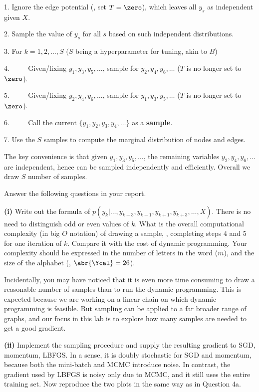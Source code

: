 \documentclass[11pt]{report}
\begin{document}
\begin{itemize}
	1. Ignore the edge potential (\ie, set $T=\zero$), which leaves all $y_s$ as independent given $X$.
	
	2. Sample the value of $y_s$ for all $s$ based on such independent distributions.
	
	3. For $k = 1, 2, \ldots, S$ ($S$ being a hyperparameter for tuning, akin to $B$)
	
	4. $\qquad$ Given/fixing $y_1, y_3, y_5, \ldots$, sample for $y_2, y_4, y_6, \ldots$ ($T$ is no longer set to $\zero$).
	
	5. $\qquad$ Given/fixing $y_2, y_4, y_6, \ldots$, sample for $y_1, y_3, y_5, \ldots$ ($T$ is no longer set to $\zero$).
	
	6. $\qquad$ Call the current $\{y_1, y_2, y_3, y_4, \ldots\}$ as a \textbf{sample}.
	
	7. Use the $S$ samples to compute the marginal distribution of nodes and edges.
	
	The key convenience is that given $y_1, y_3, y_5, \ldots$, 
	the remaining variables $y_2, y_4, y_6, \ldots$ are independent, hence can be sampled independently and efficiently.
	Overall we draw $S$ number of samples.
	
	
	
	
	Answer the following questions in your report.
	
	\textbf{(i)} 
	Write out the formula of $p(y_k|\ldots, y_{k-3}, y_{k-1}, y_{k+1}, y_{k+3}, \ldots, X)$.
	There is no need to distinguish odd or even values of $k$. 
	What is the overall computational complexity (in big $O$ notation) of drawing a sample, \ie, completing steps 4 and 5 for one iteration of $k$.
	Compare it with the cost of dynamic programming.
	Your complexity should be expressed in the number of letters in the word ($m$),
	and the size of the alphabet (\ie, $\abr{\Ycal}=26$).
	
	Incidentally, you may have noticed that it is even more time consuming to draw a reasonable number of samples than to run the dynamic programming.
	This is expected because we are working on a linear chain on which dynamic programming is feasible.
	But sampling can be applied to a far broader range of graphs,
	and our focus in this lab is to explore how many samples are needed to get a good gradient.
	
	\textbf{(ii)} 
	Implement the sampling procedure and supply the resulting gradient to SGD, momentum, LBFGS.
	In a sense, it is doubly stochastic for SGD and momentum, because both the mini-batch and MCMC introduce noise. 
	In contrast, the gradient used by LBFGS is noisy only due to MCMC,
	and it still uses the entire training set.
	Now reproduce the two plots in the same way as in Question 4a.


\end{itemize}
\end{document}
